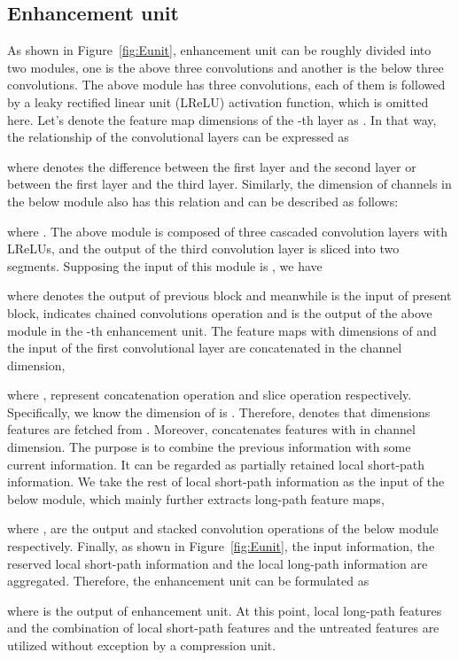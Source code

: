 \documentclass[10pt,twocolumn,letterpaper]{article}
\begin{document}
\subsection{Enhancement unit}
As shown in Figure~\ref{fig:Eunit}, enhancement unit can be roughly divided into two modules, one is the above three convolutions and another is the below three convolutions. The above module has three  convolutions, each of them is followed by a leaky rectified linear unit (LReLU) activation function, which is omitted here. Let's denote the feature map dimensions of the -th layer as . In that way, the relationship of the convolutional layers can be expressed as

where  denotes the difference between the first layer and the second layer or between the first layer and the third layer. Similarly, the dimension of channels in the below module also has this relation and can be described as follows:

where . The above module is composed of three cascaded convolution layers with LReLUs, and the output of the third convolution layer is sliced into two segments. Supposing the input of this module is , we have

where  denotes the output of previous block and meanwhile is the input of present block,  indicates chained convolutions operation and  is the output of the above module in the -th enhancement unit. The feature maps with  dimensions of  and the input of the first convolutional layer are concatenated in the channel dimension,

where ,  represent concatenation operation and slice operation respectively. Specifically, we know the dimension of  is . Therefore,  denotes that  dimensions features are fetched from . Moreover,  concatenates features with  in channel dimension. The purpose is to combine the previous information with some current information. It can be regarded as partially retained local short-path information. We take the rest of local short-path information as the input of the below module, which mainly further extracts long-path feature maps,

where ,  are the output and stacked convolution operations of the below module respectively. Finally, as shown in Figure~\ref{fig:Eunit}, the input information, the reserved local short-path information and the local long-path information are aggregated. Therefore, the enhancement unit can be formulated as

where  is the output of enhancement unit. At this point, local long-path features  and the combination of local short-path features and the untreated features  are utilized without exception by a compression unit.
\end{document}
